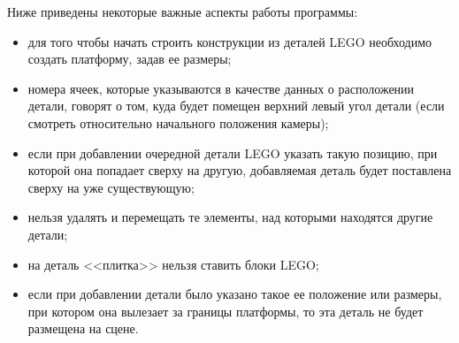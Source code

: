 Ниже приведены некоторые важные аспекты работы программы:
\begin{itemize}[label=---]
    \item для того чтобы начать строить конструкции из деталей LEGO необходимо создать платформу, задав ее размеры;
    \item номера ячеек, которые указываются в качестве данных о расположении детали, говорят о том, куда будет помещен верхний левый угол детали (если смотреть относительно начального положения камеры);
    \item если при добавлении очередной детали LEGO указать такую позицию, при которой она попадает сверху на другую, добавляемая деталь будет поставлена сверху на уже существующую;
    \item нельзя удалять и перемещать те элементы, над которыми находятся другие детали;
    \item на деталь <<плитка>> нельзя ставить блоки LEGO;
    \item если при добавлении детали было указано такое ее положение или размеры, при котором она вылезает за границы платформы, то эта деталь не будет размещена на сцене.
\end{itemize}





